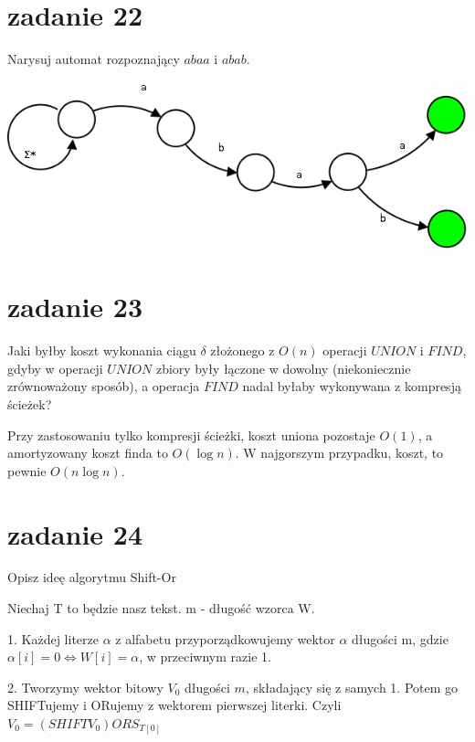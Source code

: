 \section{zadanie 22}
\begin{framed}
Narysuj automat rozpoznający $abaa$ i $abab$.
\end{framed}

\includegraphics[scale=0.55]{images/22.png}
\section{zadanie 23}
\begin{framed}
Jaki byłby koszt wykonania ciągu $\delta$ złożonego z $O(n)$ operacji $UNION$ i $FIND$, gdyby w operacji $UNION$ zbiory były łączone w dowolny (niekoniecznie zrównoważony sposób), a operacja $FIND$ nadal byłaby wykonywana z kompresją ścieżek?
\end{framed}

Przy zastosowaniu tylko kompresji ścieżki, koszt uniona pozostaje $O(1)$, a amortyzowany koszt finda to $O(\log n)$. W najgorszym przypadku, koszt, to pewnie $O(n \log n)$.

\section{zadanie 24}
\begin{framed}
Opisz ideę algorytmu Shift-Or
\end{framed}

Niechaj T to będzie nasz tekst. m - długość wzorca W.

1. Każdej literze $\alpha$ z alfabetu przyporządkowujemy wektor $\alpha$ długości m, gdzie $\alpha[i] = 0 \Leftrightarrow W[i] = \alpha$, w przeciwnym razie 1.

2. Tworzymy wektor bitowy $V_0$ długości $m$, składający się z samych 1. Potem go SHIFTujemy i ORujemy z wektorem pierwszej literki.
Czyli $V_{0} = ( SHIFTV_0) OR S_{T[0]}$

